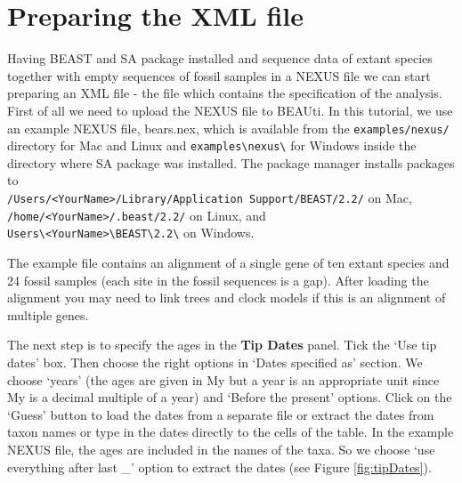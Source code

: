 \documentclass[12pt]{article}
\newcommand{\includeimage}[2][]{%
\texttt{[image: \#2]}
}
\begin{document}
\section{Preparing the XML file}

Having BEAST and SA package installed and sequence data of extant species together with empty sequences of fossil samples in a NEXUS file we can start preparing an XML file - the file which contains the specification of the analysis. First of all we need to upload the NEXUS file to BEAUti. In this tutorial, we use an example NEXUS file, bears.nex, which is available from the {\tt examples/nexus/} directory for Mac and Linux and  {\tt examples\textbackslash nexus\textbackslash} for Windows inside the directory where SA package was installed. The package manager installs packages to \\
{\tt /Users/<YourName>/Library/Application Support/BEAST/2.2/} on Mac, \\
{\tt /home/<YourName>/.beast/2.2/} on Linux, and \\
{\tt Users\textbackslash<YourName>\textbackslash BEAST\textbackslash 2.2\textbackslash} on Windows.

The example file contains an alignment of a single gene of ten extant species and 24 fossil samples (each site in the fossil sequences is a gap).   
After loading the alignment you may need to link trees and clock models if this is an alignment of multiple genes. 

The next step is to specify the ages in the {\bf Tip Dates} panel. Tick the `Use tip dates' box. Then choose the right options in `Dates specified as' section. We choose `years' (the ages are given in My but a year is an appropriate unit since My is a decimal multiple of a year) and `Before the present' options.  Click on the `Guess' button to load the dates from a separate file or extract the dates from taxon names or type in the dates directly to the cells of the table.  In the example NEXUS file, the ages are included in the names of the taxa. So we choose `use everything after last \_' option to extract the dates (see Figure \ref{fig:tipDates}).
\end{document}
